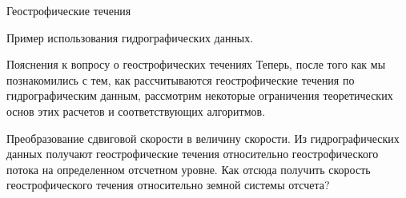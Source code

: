 \begin{chapter}{Геострофические течения}
\begin{section}{Пример использования гидрографических данных.}
\end{section}

\begin{section}{Пояснения к вопросу о геострофических течениях}
Теперь, после того как мы познакомились с тем, как рассчитываются
геострофические течения по гидрографическим данным, рассмотрим
некоторые ограничения теоретических основ этих расчетов и
соответствующих алгоритмов.
%

\begin{paragraph}{Преобразование сдвиговой скорости в величину скорости. }
Из гидрографических данных получают геострофические течения
относительно геострофического потока на определенном отсчетном
уровне. Как отсюда получить скорость геострофического течения
относительно земной системы отсчета?
%


\end{paragraph}
\end{section}
\end{chapter}

